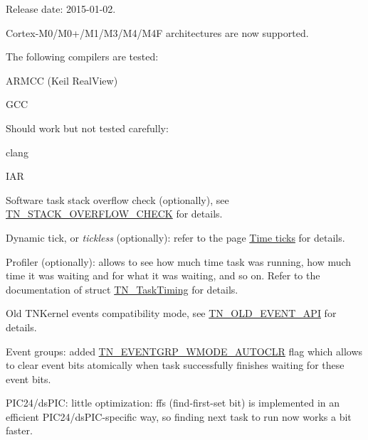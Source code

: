 Release date\+: 2015-\/01-\/02.


\begin{DoxyItemize}
\item Cortex-\/\+M0/\+M0+/\+M1/\+M3/\+M4/\+M4\+F architectures are now supported.
\begin{DoxyItemize}
\item The following compilers are tested\+:
\begin{DoxyItemize}
\item A\+R\+M\+C\+C (Keil Real\+View)
\item G\+C\+C
\end{DoxyItemize}
\item Should work but not tested carefully\+:
\begin{DoxyItemize}
\item clang
\item I\+A\+R
\end{DoxyItemize}
\end{DoxyItemize}
\item Software task stack overflow check (optionally), see {\ttfamily \hyperlink{tn__cfg__default_8h_ac6a9bbac3b3b25d9b5bc8c21d2e09955}{T\+N\+\_\+\+S\+T\+A\+C\+K\+\_\+\+O\+V\+E\+R\+F\+L\+O\+W\+\_\+\+C\+H\+E\+C\+K}} for details.
\item Dynamic tick, or {\itshape tickless} (optionally)\+: refer to the page \hyperlink{time_ticks}{Time ticks} for details.
\item Profiler (optionally)\+: allows to see how much time task was running, how much time it was waiting and for what it was waiting, and so on. Refer to the documentation of {\ttfamily struct \hyperlink{structTN__TaskTiming}{T\+N\+\_\+\+Task\+Timing}} for details.
\item Old T\+N\+Kernel events compatibility mode, see {\ttfamily \hyperlink{tn__cfg__default_8h_ac61d5f6a716cdcab205a2c8afbde4242}{T\+N\+\_\+\+O\+L\+D\+\_\+\+E\+V\+E\+N\+T\+\_\+\+A\+P\+I}} for details.
\item Event groups\+: added {\ttfamily \hyperlink{tn__eventgrp_8h_a9d42ee61ae8da342f1cd6440b7e54bbdaf45098235d31f72a2b09e30792686573}{T\+N\+\_\+\+E\+V\+E\+N\+T\+G\+R\+P\+\_\+\+W\+M\+O\+D\+E\+\_\+\+A\+U\+T\+O\+C\+L\+R}} flag which allows to clear event bits atomically when task successfully finishes waiting for these event bits.
\item P\+I\+C24/ds\+P\+I\+C\+: little optimization\+: ffs (find-\/first-\/set bit) is implemented in an efficient P\+I\+C24/ds\+P\+I\+C-\/specific way, so finding next task to run now works a bit faster.

\end{DoxyItemize}

